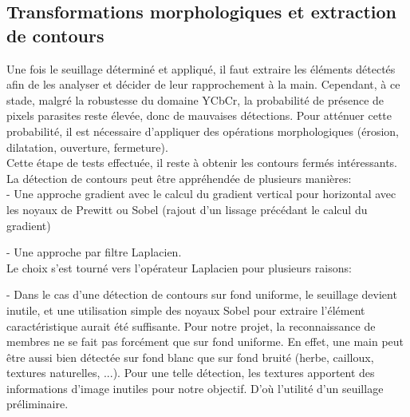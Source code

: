 \documentclass[10pt,a4paper]{report}
\begin{document}
\subsection{Transformations morphologiques et extraction de contours}
Une fois le seuillage déterminé et appliqué, il faut extraire les éléments détectés afin de les analyser et décider de leur rapprochement à la main. Cependant, à ce stade, malgré la robustesse du domaine YCbCr, la probabilité de présence de pixels parasites reste élevée, donc de mauvaises détections. Pour atténuer cette probabilité, il est nécessaire d'appliquer des opérations morphologiques (érosion, dilatation, ouverture, fermeture).\\
Cette étape de tests effectuée, il reste à obtenir les contours fermés intéressants. La détection de contours peut être appréhendée de plusieurs manières:\\

	- Une approche gradient avec le calcul du gradient vertical pour horizontal avec les noyaux de Prewitt ou Sobel (rajout d'un lissage précédant le calcul du gradient)
	
	- Une approche par filtre Laplacien.\\
	\newline
Le choix s'est tourné vers l'opérateur Laplacien pour plusieurs raisons:

	- Dans le cas d'une détection de contours sur fond uniforme, le seuillage devient inutile, et une utilisation simple des noyaux Sobel pour extraire l'élément caractéristique aurait été suffisante. Pour notre projet, la reconnaissance de membres ne se fait pas forcément que sur fond uniforme. En effet, une main peut être aussi bien détectée sur fond blanc que sur fond bruité (herbe, cailloux, textures naturelles, ...). Pour une telle détection, les textures apportent des informations d'image inutiles pour notre objectif. D'où l'utilité d'un seuillage préliminaire.
	
\end{document}
